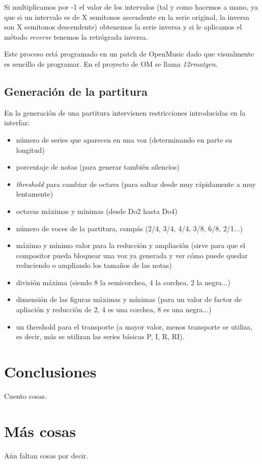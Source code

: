 \documentclass[a4paper,openright,12pt]{book}
\begin{document}
Si multiplicamos por -1 el valor de los intervalos (tal y como hacemos a mano, ya que si un intervalo es de X semitonos ascendente en la serie original, la inversa son X semitonos descendente) obtenemos la serie inversa y si le aplicamos el método \emph{reverse} tenemos la retrógrada inversa.

Este proceso está programado en un patch de OpenMusic dado que visualmente es sencillo de programar. En el proyecto de OM se llama \emph{12rmatgen}.

\section{Generación de la partitura}
En la generación de una partitura intervienen restricciones introducidas en la interfaz: 
\begin{itemize}
\item número de series que aparecen en una voz (determinando en parte su longitud)
\item porcentaje de notas (para generar también silencios)
\item \emph{threshold} para cambiar de octava (para saltar desde muy rápidamente a muy lentamente)
\item octavas máximas y mínimas (desde Do2 hasta Do4)
\item número de voces de la partitura, compás (2/4, 3/4, 4/4, 3/8, 6/8, 2/1...)
\item máximo y mínimo valor para la reducción y ampliación (sirve para que el compositor pueda bloquear una voz ya generada y ver cómo puede quedar reduciendo o ampliando los tamaños de las notas)
\item división máxima (siendo 8 la semicorchea, 4 la corchea, 2 la negra...)
\item dimensión de las figuras máximas y mínimas (para un valor de factor de apliación y reducción de 2, 4 es una corchea, 8 es una negra...)
\item un threshold para el transporte (a mayor valor, menos transporte se utiliza, es decir, más se utilizan las series básicas P, I, R, RI).
\end{itemize}



\chapter{Conclusiones}\label{conclusiones}
Cuento cosas.

\cleardoublepage
{}



\appendix
\chapter{Más cosas}\label{aped.A}
Aún faltan cosas por decir.
\end{document}
